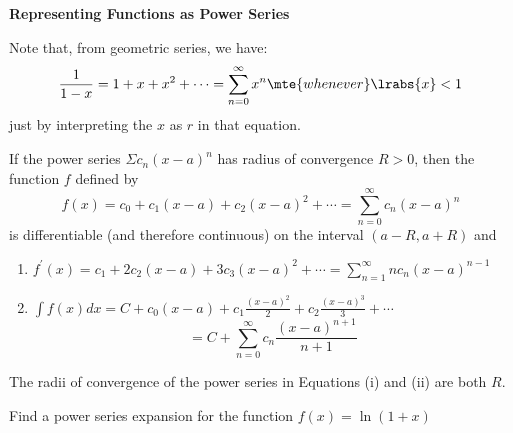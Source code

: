 
\chead{\today}
\graphicspath{ {\string~/Desktop} }
\usetikzlibrary{arrows}
\newcommand{\ans}[1]{ \noindent {\color{red} \textbf{Answer:} #1}}
\renewcommand{\ans}[1]{\vspace{3in}}

\begin{center}
\textbf{Representing Functions as Power Series}
\end{center}

\begin{aun}
	Note that, from geometric series, we have:
	\[
		\frac{1}{1-x} =1 + x + x ^2 + \cdots =\sum_{n = 0}^\infty x^n \mte{ whenever } \lrabs{x} < 1
	\]
	just by interpreting the $x$ as $r$ in that equation. 
\end{aun}

\begin{thm} 
If the power series $\Sigma c_n(x-a)^n$ has radius of convergence $R>0$, then the function $f$ defined by
$$
f(x)=c_0+c_1(x-a)+c_2(x-a)^2+\cdots=\sum_{n=0}^{\infty} c_n(x-a)^n
$$
is differentiable (and therefore continuous) on the interval $(a-R, a+R)$ and
\begin{enumerate}[label=$(\roman*)$]
	\item $f^{\prime}(x)=c_1+2 c_2(x-a)+3 c_3(x-a)^2+\cdots=\sum_{n=1}^{\infty} n c_n(x-a)^{n-1}$
	\item $\int f(x) d x=C+c_0(x-a)+c_1 \frac{(x-a)^2}{2}+c_2 \frac{(x-a)^3}{3}+\cdots$
$$
=C+\sum_{n=0}^{\infty} c_n \frac{(x-a)^{n+1}}{n+1}
$$
\end{enumerate}
The radii of convergence of the power series in Equations (i) and (ii) are both $R$.
\end{thm}

\begin{exx}
	Find a power series expansion for the function $f(x) = \ln(1+x)$
\end{exx}

\ans{We can use the power series expansion for $\frac{1}{1+x}$ and integrate it.}


\ans{\href{https://tutorial.math.lamar.edu/Solutions/CalcII/PowerSeriesandFunctions/Prob4.aspx}{Link}}


\ans{\href{https://tutorial.math.lamar.edu/Solutions/CalcII/PowerSeriesandFunctions/Prob3.aspx}{Link}}







